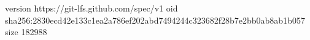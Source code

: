 version https://git-lfs.github.com/spec/v1
oid sha256:2830ecd42e133c1ea2a786ef202abd7494244c323682f28b7e2bb0ab8ab1b057
size 182988
